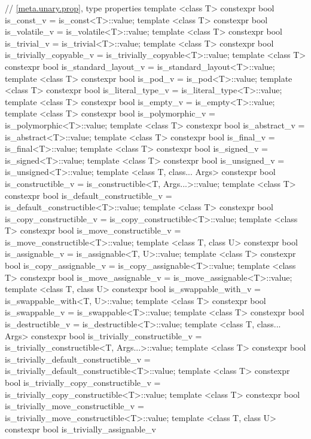 \begin{codeblock}
{  // \ref{meta.unary.prop}, type properties
  template <class T> constexpr bool is_const_v
    = is_const<T>::value;
  template <class T> constexpr bool is_volatile_v
    = is_volatile<T>::value;
  template <class T> constexpr bool is_trivial_v
    = is_trivial<T>::value;
  template <class T> constexpr bool is_trivially_copyable_v
    = is_trivially_copyable<T>::value;
  template <class T> constexpr bool is_standard_layout_v
    = is_standard_layout<T>::value;
  template <class T> constexpr bool is_pod_v
    = is_pod<T>::value;
  template <class T> constexpr bool is_literal_type_v
    = is_literal_type<T>::value;
  template <class T> constexpr bool is_empty_v
    = is_empty<T>::value;
  template <class T> constexpr bool is_polymorphic_v
    = is_polymorphic<T>::value;
  template <class T> constexpr bool is_abstract_v
    = is_abstract<T>::value;
  template <class T> constexpr bool is_final_v
    = is_final<T>::value;
  template <class T> constexpr bool is_signed_v
    = is_signed<T>::value;
  template <class T> constexpr bool is_unsigned_v
    = is_unsigned<T>::value;
  template <class T, class... Args> constexpr bool is_constructible_v
    = is_constructible<T, Args...>::value;
  template <class T> constexpr bool is_default_constructible_v
    = is_default_constructible<T>::value;
  template <class T> constexpr bool is_copy_constructible_v
    = is_copy_constructible<T>::value;
  template <class T> constexpr bool is_move_constructible_v
    = is_move_constructible<T>::value;
  template <class T, class U> constexpr bool is_assignable_v
    = is_assignable<T, U>::value;
  template <class T> constexpr bool is_copy_assignable_v
    = is_copy_assignable<T>::value;
  template <class T> constexpr bool is_move_assignable_v
    = is_move_assignable<T>::value;
  template <class T, class U> constexpr bool is_swappable_with_v
    = is_swappable_with<T, U>::value;
  template <class T> constexpr bool is_swappable_v
    = is_swappable<T>::value;
  template <class T> constexpr bool is_destructible_v
    = is_destructible<T>::value;
  template <class T, class... Args> constexpr bool is_trivially_constructible_v
    = is_trivially_constructible<T, Args...>::value;
  template <class T> constexpr bool is_trivially_default_constructible_v
    = is_trivially_default_constructible<T>::value;
  template <class T> constexpr bool is_trivially_copy_constructible_v
    = is_trivially_copy_constructible<T>::value;
  template <class T> constexpr bool is_trivially_move_constructible_v
    = is_trivially_move_constructible<T>::value;
  template <class T, class U> constexpr bool is_trivially_assignable_v
}
\end{codeblock}
